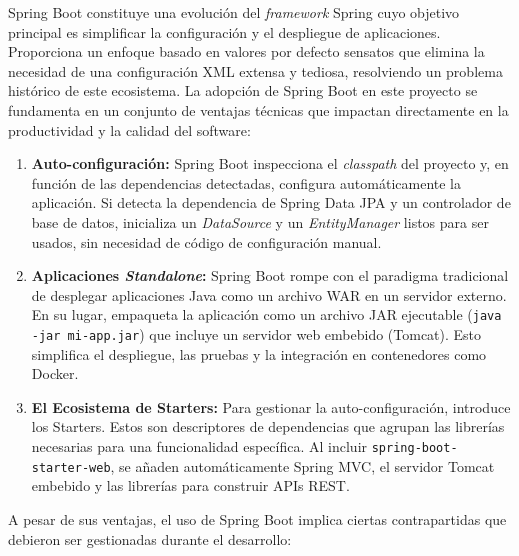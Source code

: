 Spring Boot constituye una evolución del \textit{framework} Spring cuyo objetivo principal es simplificar la configuración y el despliegue de aplicaciones. Proporciona un enfoque basado en valores por defecto sensatos que elimina la necesidad de una configuración XML extensa y tediosa, resolviendo un problema histórico de este ecosistema. La adopción de Spring Boot en este proyecto se fundamenta en un conjunto de ventajas técnicas que impactan directamente en la productividad y la calidad del software:

\begin{enumerate}
    \item \textbf{Auto-configuración:} Spring Boot inspecciona el \textit{classpath} del proyecto y, en función de las dependencias detectadas, configura automáticamente la aplicación. Si detecta la dependencia de Spring Data JPA y un controlador de base de datos, inicializa un \textit{DataSource} y un \textit{EntityManager} listos para ser usados, sin necesidad de código de configuración manual. \cite{spring-boot-autoconfig}
    \item \textbf{Aplicaciones \textit{Standalone}:} Spring Boot rompe con el paradigma tradicional de desplegar aplicaciones Java como un archivo WAR en un servidor externo. En su lugar, empaqueta la aplicación como un archivo JAR ejecutable (\texttt{java -jar mi-app.jar}) que incluye un servidor web embebido (Tomcat). Esto simplifica el despliegue, las pruebas y la integración en contenedores como Docker. \cite{spring-boot-embedded}
    \item \textbf{El Ecosistema de Starters:} Para gestionar la auto-configuración, introduce los Starters. Estos son descriptores de dependencias que agrupan las librerías necesarias para una funcionalidad específica. Al incluir \texttt{spring-boot-starter-web}, se añaden automáticamente Spring MVC, el servidor Tomcat embebido y las librerías para construir APIs REST. \cite{spring-boot-starters}
\end{enumerate}

A pesar de sus ventajas, el uso de Spring Boot implica ciertas contrapartidas que debieron ser gestionadas durante el desarrollo:

